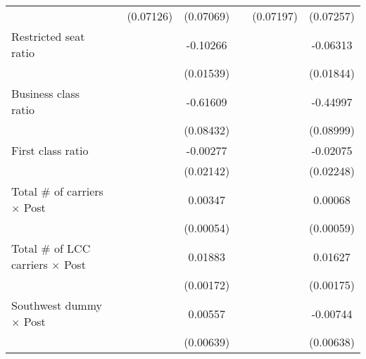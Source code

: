 \begin{table}[htbp]
\begin{tabular}{l*{6}{c}}
                    &                     &   (0.07126)         &   (0.07069)         &                     &   (0.07197)         &   (0.07257)         \\
\addlinespace
Restricted seat ratio&                     &                     &    -0.10266\sym{***}&                     &                     &    -0.06313\sym{***}\\
                    &                     &                     &   (0.01539)         &                     &                     &   (0.01844)         \\
\addlinespace
Business class ratio&                     &                     &    -0.61609\sym{***}&                     &                     &    -0.44997\sym{***}\\
                    &                     &                     &   (0.08432)         &                     &                     &   (0.08999)         \\
\addlinespace
First class ratio   &                     &                     &    -0.00277         &                     &                     &    -0.02075         \\
                    &                     &                     &   (0.02142)         &                     &                     &   (0.02248)         \\
\addlinespace
Total # of carriers $\times$ Post&                     &                     &     0.00347\sym{***}&                     &                     &     0.00068         \\
                    &                     &                     &   (0.00054)         &                     &                     &   (0.00059)         \\
\addlinespace
Total # of LCC carriers $\times$ Post&                     &                     &     0.01883\sym{***}&                     &                     &     0.01627\sym{***}\\
                    &                     &                     &   (0.00172)         &                     &                     &   (0.00175)         \\
\addlinespace
Southwest dummy $\times$ Post&                     &                     &     0.00557         &                     &                     &    -0.00744         \\
                    &                     &                     &   (0.00639)         &                     &                     &   (0.00638)         \\

\end{tabular}
\end{table}
